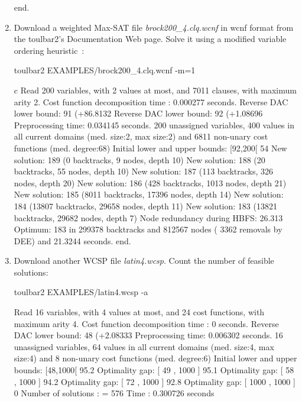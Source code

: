 \begin{enumerate}
{\begin{DoxyCode}
end.
\end{DoxyCode}}
\item Download a weighted Max-SAT file {\em brock200\_4.clq.wcnf} in wcnf format from the toulbar2's Documentation Web page. Solve it using a modified variable ordering heuristic~\cite{Schiex14a}:
\begin{DoxyCode}
	toulbar2 EXAMPLES/brock200_4.clq.wcnf -m=1
\end{DoxyCode}
{\scriptsize
\begin{DoxyCode}
c Read 200 variables, with 2 values at most, and 7011 clauses, with maximum arity 2.
Cost function decomposition time : 0.000277 seconds.
Reverse DAC lower bound: 91 (+86.8132%
Reverse DAC lower bound: 92 (+1.08696%
Preprocessing time: 0.034145 seconds.
200 unassigned variables, 400 values in all current domains (med. size:2, max size:2) and 6811 non-unary cost functions (med. degree:68)
Initial lower and upper bounds: [92,200[ 54%
New solution: 189 (0 backtracks, 9 nodes, depth 10)
New solution: 188 (20 backtracks, 55 nodes, depth 10)
New solution: 187 (113 backtracks, 326 nodes, depth 20)
New solution: 186 (428 backtracks, 1013 nodes, depth 21)
New solution: 185 (8011 backtracks, 17396 nodes, depth 14)
New solution: 184 (13807 backtracks, 29658 nodes, depth 11)
New solution: 183 (13821 backtracks, 29682 nodes, depth 7)
Node redundancy during HBFS: 26.313 %
Optimum: 183 in 299378 backtracks and 812567 nodes ( 3362 removals by DEE) and 21.3244 seconds.
end.
\end{DoxyCode}}
\item Download another WCSP file {\em latin4.wcsp}. Count the number of feasible solutions:
\begin{DoxyCode}
	toulbar2 EXAMPLES/latin4.wcsp -a
\end{DoxyCode}
{\scriptsize
\begin{DoxyCode}
Read 16 variables, with 4 values at most, and 24 cost functions, with maximum arity 4.
Cost function decomposition time : 0 seconds.
Reverse DAC lower bound: 48 (+2.08333%
Preprocessing time: 0.006302 seconds.
16 unassigned variables, 64 values in all current domains (med. size:4, max size:4) and 8 non-unary cost functions (med. degree:6)
Initial lower and upper bounds: [48,1000[ 95.2%
Optimality gap: [ 49 , 1000 ] 95.1 %
Optimality gap: [ 58 , 1000 ] 94.2 %
Optimality gap: [ 72 , 1000 ] 92.8 %
Optimality gap: [ 1000 , 1000 ] 0 %
Number of solutions    : =  576
Time                   :    0.300726 seconds

\end{DoxyCode}}
\end{enumerate}
